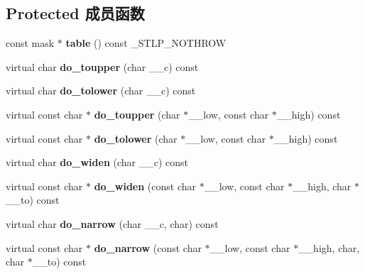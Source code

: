 \subsection*{Protected 成员函数}
\begin{DoxyCompactItemize}
\item 
\mbox{\label{classctype_3_01char_01_4_a152d036e95d15ed6a52e2a827df62930}} 
const mask $\ast$ {\bfseries table} () const \+\_\+\+S\+T\+L\+P\+\_\+\+N\+O\+T\+H\+R\+OW
\item 
\mbox{\label{classctype_3_01char_01_4_aed5cd9da452858404140f145e2087f6c}} 
virtual char {\bfseries do\+\_\+toupper} (char \+\_\+\+\_\+c) const
\item 
\mbox{\label{classctype_3_01char_01_4_a993e30e53dda1201d9dba8fa28f43191}} 
virtual char {\bfseries do\+\_\+tolower} (char \+\_\+\+\_\+c) const
\item 
\mbox{\label{classctype_3_01char_01_4_a392236d234ad374fbd5a7f615f978806}} 
virtual const char $\ast$ {\bfseries do\+\_\+toupper} (char $\ast$\+\_\+\+\_\+low, const char $\ast$\+\_\+\+\_\+high) const
\item 
\mbox{\label{classctype_3_01char_01_4_a9aa5c6fd40675a88399de9bba453efac}} 
virtual const char $\ast$ {\bfseries do\+\_\+tolower} (char $\ast$\+\_\+\+\_\+low, const char $\ast$\+\_\+\+\_\+high) const
\item 
\mbox{\label{classctype_3_01char_01_4_a64bbd5d98ec39a89966a208ac805246c}} 
virtual char {\bfseries do\+\_\+widen} (char \+\_\+\+\_\+c) const
\item 
\mbox{\label{classctype_3_01char_01_4_aa900d598c038ae67321d48697cf99e0a}} 
virtual const char $\ast$ {\bfseries do\+\_\+widen} (const char $\ast$\+\_\+\+\_\+low, const char $\ast$\+\_\+\+\_\+high, char $\ast$\+\_\+\+\_\+to) const
\item 
\mbox{\label{classctype_3_01char_01_4_af4370abdc91c630f3f90fa67b92a2f86}} 
virtual char {\bfseries do\+\_\+narrow} (char \+\_\+\+\_\+c, char) const
\item 
\mbox{\label{classctype_3_01char_01_4_a2ef07212f6eb6f66c83aeac965f2b93c}} 
virtual const char $\ast$ {\bfseries do\+\_\+narrow} (const char $\ast$\+\_\+\+\_\+low, const char $\ast$\+\_\+\+\_\+high, char, char $\ast$\+\_\+\+\_\+to) const
\end{DoxyCompactItemize}
